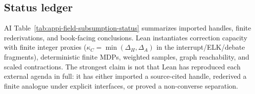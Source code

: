 \subsection{Status ledger}
\label{sec:appi-book-field-subsumptions}
\begin{authbar}{AI}
Table~\ref{tab:appi-field-subsumption-status} summarizes imported handles, finite rederivations, and book-facing conclusions.
Lean instantiates correction capacity with finite integer proxies (\(\kappa_C=\min(\Delta_H,\Delta_A)\) in the interrupt/ELK/debate fragments), deterministic finite MDPs, weighted samples, graph reachability, and scaled contractions.
The strongest claim is not that Lean has reproduced each external agenda in full: it has either imported a source-cited handle, rederived a finite analogue under explicit interfaces, or proved a non-converse separation.

\small
\setlength{\tabcolsep}{4pt}
\renewcommand{\arraystretch}{1.22}
\end{authbar}
